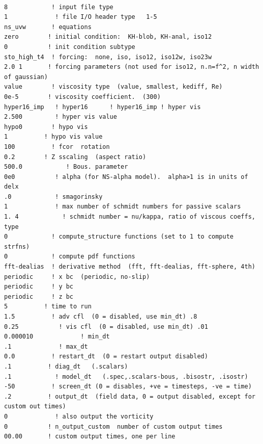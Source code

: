 \documentclass[12pt]{article}
\begin{document}
\begin{verbatim}

8            ! input file type
1             ! file I/O header type   1-5
ns_uvw       ! equations
zero        ! initial condition:  KH-blob, KH-anal, iso12
0           ! init condition subtype
sto_high_t4  ! forcing:  none, iso, iso12, iso12w, iso23w
2.0 1       ! forcing parameters (not used for iso12, n.n=f^2, n width of gaussian)
value        ! viscosity type  (value, smallest, kediff, Re)
0e-5        ! viscosity coefficient.  (300)
hyper16_imp   ! hyper16      ! hyper16_imp ! hyper vis
2.500         ! hyper vis value
hypo0        ! hypo vis
1          ! hypo vis value
100          ! fcor  rotation
0.2        ! Z sscaling  (aspect ratio)
500.0            ! Bous. parameter  
0e0           ! alpha (for NS-alpha model).  alpha>1 is in units of delx
.0            ! smagorinsky
1             ! max number of schmidt numbers for passive scalars
1. 4            ! schmidt number = nu/kappa, ratio of viscous coeffs, type
0            ! compute_structure functions (set to 1 to compute strfns)
0            ! compute pdf functions
fft-dealias  ! derivative method  (fft, fft-dealias, fft-sphere, 4th)
periodic     ! x bc  (periodic, no-slip)
periodic     ! y bc
periodic     ! z bc
5          ! time to run
1.5          ! adv cfl  (0 = disabled, use min_dt) .8
0.25           ! vis cfl  (0 = disabled, use min_dt) .01
0.000010             ! min_dt
.1             ! max_dt
0.0          ! restart_dt  (0 = restart output disabled)
.1          ! diag_dt   (.scalars)
.1            ! model_dt   (.spec,.scalars-bous, .bisostr, .isostr)
-50          ! screen_dt (0 = disables, +ve = timesteps, -ve = time)
.2          ! output_dt  (field data, 0 = output disabled, except for custom out times)
0             ! also output the vorticity
0           ! n_output_custom  number of custom output times
00.00       ! custom output times, one per line



\end{verbatim}
\end{document}
